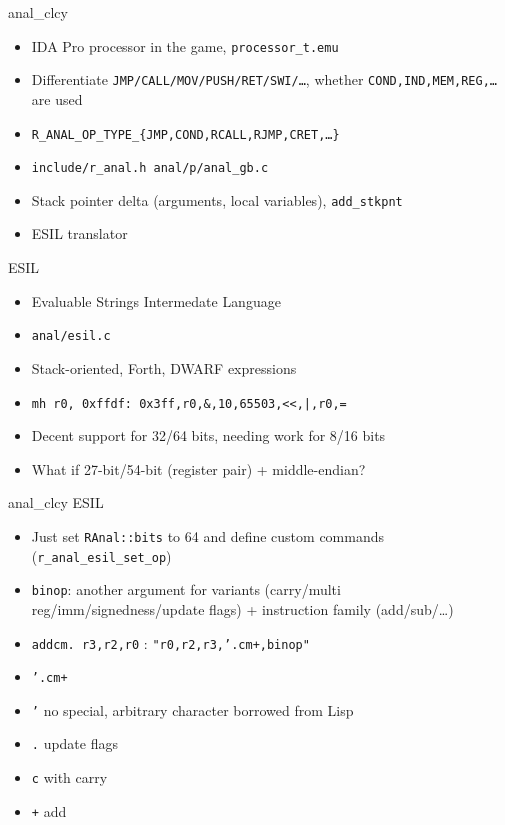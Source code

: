 \documentclass{beamer}
\begin{document}
\begin{frame}{anal\_clcy}
  \begin{itemize}
  \item IDA Pro processor in the game, \texttt{processor\_t.emu}
  \item Differentiate \texttt{JMP/CALL/MOV/PUSH/RET/SWI/\ldots}, whether \texttt{COND,IND,MEM,REG,\ldots} are used
  \item \texttt{R\_ANAL\_OP\_TYPE\_\{JMP,COND,RCALL,RJMP,CRET,\ldots\}}
  \item \texttt{include/r\_anal.h anal/p/anal\_gb.c}
  \item Stack pointer delta (arguments, local variables), \texttt{add\_stkpnt}
  \item ESIL translator
  \end{itemize}
\end{frame}

\begin{frame}{ESIL}
  \begin{itemize}
  \item {\color{red}E}valuable {\color{red}S}trings {\color{red}I}ntermedate {\color{red}L}anguage
  \item \texttt{anal/esil.c}
  \item Stack-oriented, Forth, DWARF expressions
  \item \texttt{mh r0, 0xffdf: 0x3ff,r0,\&,10,65503,<<,|,r0,=}
  \item Decent support for 32/64 bits, needing work for 8/16 bits
  \item What if 27-bit/54-bit (register pair) + middle-endian?
  \end{itemize}
\end{frame}

\begin{frame}{anal\_clcy ESIL}
  \begin{itemize}
  \item Just set \texttt{RAnal::bits} to 64 and define custom commands (\texttt{r\_anal\_esil\_set\_op})
  \item \texttt{binop}: another argument for variants (carry/multi reg/imm/signedness/update
    flags) + instruction family (add/sub/\ldots)
  \item \texttt{addcm. r3,r2,r0} : \texttt{"r0,r2,r3,'.cm+,binop"}
  \item \alert{\texttt{'.cm+}}
  \item \texttt{'} no special, arbitrary character borrowed from Lisp
  \item \texttt{.} update flags
  \item \texttt{c} with carry
  \item \texttt{+} add
  \end{itemize}
\end{frame}
\end{document}
